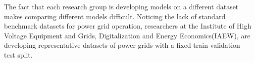 The fact that each research group is developing models on a different dataset makes
comparing different models difficult.
Noticing the lack of standard benchmark datasets for power grid operation,
researchers at the Institute of High Voltage Equipment and Grids, Digitalization and Energy Economics(IAEW),
are developing representative datasets of power grids with a fixed train-validation-test split.